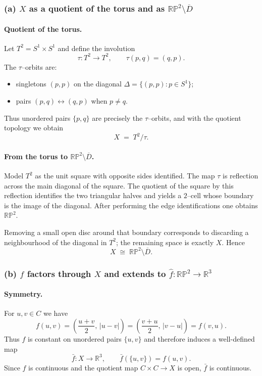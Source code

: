 \documentclass[12pt,a4paper]{article}
\theoremstyle{plain}
\theoremstyle{definition}      %
\begin{document}
\subsubsection*{(a) $X$ as a quotient of the torus and as
	$\mathbb{RP}^{2}\setminus \overline{D}$}

\paragraph{Quotient of the torus.}
Let $T^{2}=S^{1}\times S^{1}$ and define the involution
\[
\tau:T^{2}\longrightarrow T^{2},\qquad \tau(p,q)=(q,p).
\]
The $\tau$–orbits are:
\begin{itemize}
	\item singletons $(p,p)$ on the diagonal $\Delta=\{(p,p):p\in S^{1}\}$;
	\item pairs $(p,q)\leftrightarrow(q,p)$ when $p\neq q$.
\end{itemize}
Thus unordered pairs $\{p,q\}$ are precisely the $\tau$–orbits, and with the
quotient topology we obtain
\[
X \;=\; T^{2}/\tau.
\]

\paragraph{From the torus to $\mathbb{RP}^{2}\setminus\overline{D}$.}
Model $T^{2}$ as the unit square with opposite sides identified.
The map $\tau$ is reflection across the main diagonal of the square.
The quotient of the square by this reflection identifies the two triangular
halves and yields a $2$–cell whose boundary is the image of the diagonal.
After performing the edge identifications one obtains $\mathbb{RP}^{2}$.

Removing a small open disc around that boundary corresponds to discarding a
neighbourhood of the diagonal in $T^{2}$; the remaining space is exactly $X$.
Hence
\[
X \;\cong\; \mathbb{RP}^{2}\setminus\overline{D}.
\]


\subsubsection*{(b) $f$ factors through $X$ and extends to
	$\hat f:\mathbb{RP}^{2}\to\mathbb{R}^{3}$}

\paragraph{Symmetry.}
For $u,v\in C$ we have
\[
f(u,v)
=\left(\frac{u+v}{2},\,|u-v|\right)
=\left(\frac{v+u}{2},\,|v-u|\right)
=f(v,u).
\]
Thus $f$ is constant on unordered pairs $\{u,v\}$ and therefore induces a
well-defined map
\[
\bar f:X\longrightarrow\mathbb{R}^{3},\qquad
\bar f(\{u,v\})=f(u,v).
\]
Since $f$ is continuous and the quotient map $C\times C\to X$ is open,
$\bar f$ is continuous.
\end{document}
